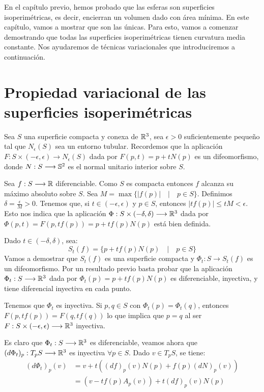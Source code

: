 En el capítulo previo, hemos probado que las esferas son superficies isoperimétricas, es decir,  encierran un volumen dado con área mínima. En este capítulo, vamos a mostrar que son las únicas. Para esto, vamos a comenzar demostrando que todas las superficies isoperimétricas tienen curvatura media constante. Nos ayudaremos de técnicas variacionales que introduciremos a continuación.

\section{Propiedad variacional de las superficies isoperimétricas}

Sea $S$ una superficie compacta y conexa de $\mathbb{R}^3$, sea $\epsilon > 0$ suficientemente pequeño tal que $N_\epsilon(S)$ sea un entorno tubular. Recordemos que la aplicación $F: S \times (-\epsilon, \epsilon) \longrightarrow N_\epsilon(S)$ dada por $F(p,t)=p + tN(p)$ es un difeomorfismo, donde $N: S \longrightarrow \mathbb{S}^2$ es el normal unitario interior sobre $S$.

Sea $f: S \longrightarrow \mathbb{R}$ diferenciable. Como $S$ es compacta entonces $f$ alcanza su máximo absoluto sobre $S$. Sea $M=\max \{ |f(p)| \quad | \quad p \in S \}$. Definimos $\delta = \frac{\epsilon}{M} > 0$. Tenemos que, si $t \in (-\epsilon, \epsilon)$ y $p\in S$, entonces $|tf(p)| \leq tM < \epsilon$. Esto nos indica que la aplicación $\Phi: S \times (-\delta, \delta) \longrightarrow \mathbb{R}^3$ dada por $\Phi(p,t) = F(p, tf(p)) = p + tf(p)N(p)$ está bien definida.

Dado $t \in (-\delta, \delta)$, sea:
%
\begin{equation*}
    S_t(f) = \{ p + tf(p)N(p) \quad | \quad p \in S \}
\end{equation*}
%
Vamos a demostrar que $S_t(f)$ es una superficie compacta y $\Phi_t: S \longrightarrow S_t(f)$ es un difeomorfismo. Por un resultado previo basta probar que la aplicación $\Phi_t: S \longrightarrow \mathbb{R}^3$ dada por $\Phi_t(p)=p+tf(p)N(p)$ es diferenciable, inyectiva, y tiene diferencial inyectiva en cada punto.

Tenemos que $\Phi_t$ es inyectiva. Si $p,q \in S$ con $\Phi_t(p) = \Phi_t(q)$, entonces $F(p, tf(p)) = F(q, tf(q))$ lo que implica que $p=q$ al ser $F: S \times (-\epsilon, \epsilon) \longrightarrow \mathbb{R}^3$ inyectiva.

Es claro que $\Phi_t: S \longrightarrow \mathbb{R}^3$ es diferenciable,  veamos ahora que $(d\Phi_t)_p: T_pS \longrightarrow \mathbb{R}^3$ es inyectiva $\forall p \in S$. Dado $v \in T_pS$, se tiene:
%
\begin{align*}
    (d\Phi_t)_p(v) &= v + t \left( (df)_p(v)N(p) + f(p)(dN)_p(v) \right) \\
    &= \left( v - tf(p)A_p(v) \right) + t(df)_p(v)N(p)
\end{align*}

